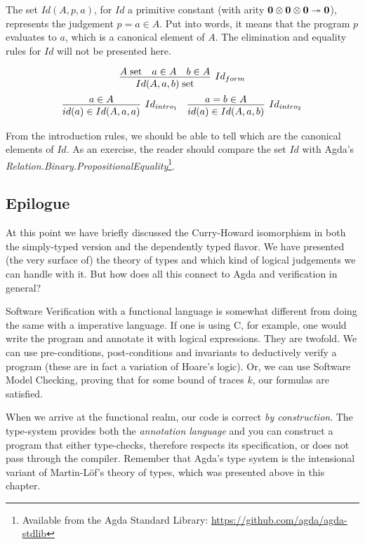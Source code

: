 The set $Id(A, p, a)$, for $Id$ a primitive constant (with arity $\textbf{0} \otimes \textbf{0} \otimes \textbf{0} \twoheadrightarrow \textbf{0}$),
represents the judgement $p = a \in A$. Put into words, it means that the program $p$ evaluates to $a$,
which is a canonical element of $A$. The elimination and equality rules for $Id$ will not be presented here.

\[
  \infer[Id_{form}]
        {\isset{Id(A, a, b)}}
        { \isset{A}
        & a \in A
        & b \in A
        }
\]
\[
\begin{array}{c c}
  \infer[Id_{intro_1}]
        {id(a) \in Id(A, a, a)}
        {a \in A}
&
  \infer[Id_{intro_2}]
        {id(a) \in Id(A, a, b)}
        {a = b \in A}
\end{array}
\]

From the introduction rules, we should be able to tell which are the canonical elements of $Id$.
As an exercise, the reader should compare the set $Id$ with Agda's \emph{Relation.Binary.PropositionalEquality}\footnote{%
Available from the Agda Standard Library: \url{https://github.com/agda/agda-stdlib}
}.

\subsection{Epilogue}

At this point we have briefly discussed the Curry-Howard isomorphism in both the simply-typed
version and the dependently typed flavor. We have presented (the very surface of) the theory
of types and which kind of logical judgements we can handle with it. But how does all this connect
to Agda and verification in general?

Software Verification with a functional language is somewhat different from doing the same with a imperative language. 
If one is using C, for example, one would write the program and annotate it with logical expressions.
They are twofold. We can use pre-conditions, post-conditions and invariants to deductively verify a program
(these are in fact a variation of Hoare's logic). Or, we can use Software Model Checking, proving
that for some bound of traces $k$, our formulas are satisfied.

When we arrive at the functional realm, our code is correct \emph{by construction}. The type-system
provides both the \emph{annotation language} and you can construct a program that either type-checks,
therefore respects its specification, or does not pass through the compiler. Remember that Agda's
type system is the intensional variant of Martin-L\"{o}f's theory of types, which was presented above
in this chapter.


